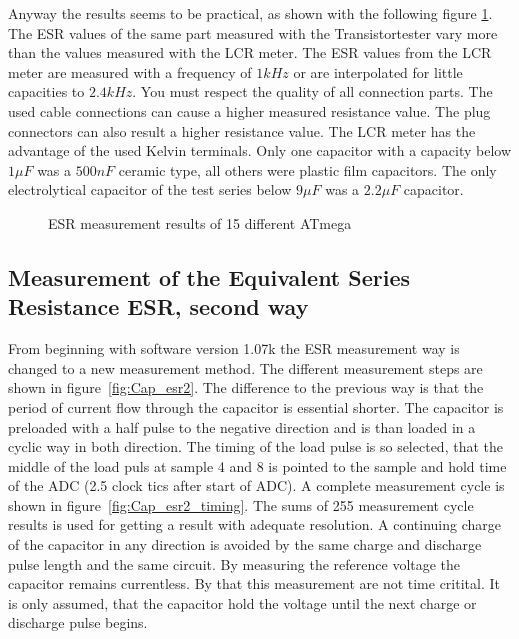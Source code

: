 Anyway the results seems to be practical, as shown with the following figure \ref{fig:Cesr}.
The ESR values of the same part measured with the Transistortester vary more than the values measured with the LCR meter.
The ESR values from the LCR meter are measured with a frequency of \(1kHz\) or are interpolated for little capacities to
\(2.4kHz\).
You must respect the quality of all connection parts. The used cable connections can cause a higher measured resistance value.
The plug connectors can also result a higher resistance value.
The LCR meter has the advantage of the used Kelvin terminals.
Only one capacitor with a capacity below \(1\mu F\) was a \(500nF\) ceramic type, all others were
plastic film capacitors.
The only electrolytical capacitor of the test series below \(9\mu F\) was a \(2.2\mu F\) capacitor.

\begin{figure}[H]
\centering

\caption{ESR measurement results of 15 different ATmega}
\label{fig:Cesr}
\end{figure}


\subsection{Measurement of the Equivalent Series Resistance ESR, second way}
\label{sec:ESR2}
From beginning with software version 1.07k the ESR measurement way is changed to a new measurement method.
The different measurement steps are shown in figure~\ref{fig:Cap_esr2}. The difference to the previous way is that
the period of current flow through the capacitor is essential shorter.
The capacitor is preloaded with a half pulse to the negative direction and is than loaded in a cyclic way in both
direction.
The timing of the load pulse is so selected, that the middle of the load puls at sample 4 and 8 is
pointed to the sample and hold time of the ADC (2.5 clock tics after start of ADC). 
A complete measurement cycle is shown in figure~\ref{fig:Cap_esr2_timing}.
The sums of 255 measurement cycle results is used for getting a result with adequate resolution. 
A continuing charge of the capacitor in any direction is avoided by the same charge and discharge pulse length
and the same circuit.
By measuring the reference voltage the capacitor remains currentless. By that this measurement are not time critital.
It is only assumed, that the capacitor hold the voltage until the next charge or discharge pulse begins.

